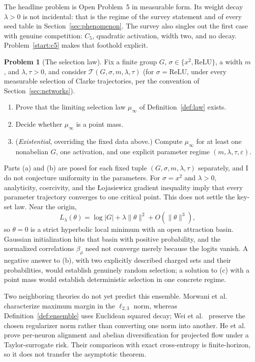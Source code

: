 \documentclass[11pt]{amsart}
\theoremstyle{plain}
\theoremstyle{definition}
\newtheorem{problem}[theorem]{Problem}
\begin{document}
The headline problem is Open Problem~5 in measurable form. Its weight decay $\lambda > 0$ is not incidental: that is the regime of the survey statement and of every seed table in Section~\ref{sec:phenomenon}. The survey also singles out the first case with genuine competition: $C_5$, quadratic activation, width two, and no decay. Problem~\ref{start:c5} makes that foothold explicit.

\begin{problem}[The selection law]\label{prob:law}
Fix a finite group $G$, $\sigma \in \{x^2, \mathrm{ReLU}\}$, a width $m$, and $\lambda, \tau > 0$, and consider $\mathcal{T}(G,\sigma,m,\lambda,\tau)$ (for $\sigma = \mathrm{ReLU}$, under every measurable selection of Clarke trajectories, per the convention of Section~\ref{sec:networks}).
\begin{enumerate}
\item[(a)] Prove that the limiting selection law $\mu_\infty$ of Definition~\ref{def:law} exists.
\item[(b)] Decide whether $\mu_\infty$ is a point mass.
\item[(c)] (\emph{Existential}, overriding the fixed data above.) Compute $\mu_\infty$ for at least one nonabelian $G$, one activation, and one explicit parameter regime $(m, \lambda, \tau, \varepsilon)$.
\end{enumerate}
\end{problem}

Parts (a) and (b) are posed for each fixed tuple $(G,\sigma,m,\lambda,\tau)$ separately, and I do not conjecture uniformity in the parameters. For $\sigma=x^2$ and $\lambda>0$, analyticity, coercivity, and the {\L}ojasiewicz gradient inequality \cite{lojasiewicz1984} imply that every parameter trajectory converges to one critical point. This does not settle the key-set law. Near the origin,
\[
L_\lambda(\theta)=\log|G|+\lambda\|\theta\|^2+O(\|\theta\|^3),
\]
so $\theta=0$ is a strict hyperbolic local minimum with an open attraction basin. Gaussian initialization hits that basin with positive probability, and the normalized correlations $\beta_\rho$ need not converge merely because the logits vanish. A negative answer to (b), with two explicitly described charged sets and their probabilities, would establish genuinely random selection; a solution to (c) with a point mass would establish deterministic selection in one concrete regime.

Two neighboring theories do not yet predict this ensemble. Morwani et al.~\cite{morwani2024} characterize maximum margin in the $\ell_{2,3}$ norm, whereas Definition~\ref{def:ensemble} uses Euclidean squared decay; Wei et al.~\cite{wei2019} preserve the chosen regularizer norm rather than converting one norm into another. He et al.~\cite{he2026spectral} prove per-neuron alignment and abelian diversification for projected flow under a Taylor-surrogate risk. Their comparison with exact cross-entropy is finite-horizon, so it does not transfer the asymptotic theorem.
\end{document}
